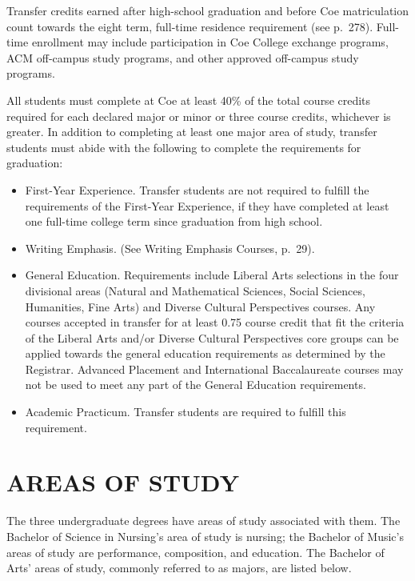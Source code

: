 \documentclass[
  letterpaper,
]{scrbook}
\providecommand{\tightlist}{%
  \setlength{\itemsep}{0pt}\setlength{\parskip}{0pt}}
\begin{document}
Transfer credits earned after high-school graduation and before Coe
matriculation count towards the eight term, full-time residence
requirement (see p.~278). Full-time enrollment may include participation
in Coe College exchange programs, ACM off-campus study programs, and
other approved off-campus study programs.

All students must complete at Coe at least 40\% of the total course
credits required for each declared major or minor or three course
credits, whichever is greater. In addition to completing at least one
major area of study, transfer students must abide with the following to
complete the requirements for graduation:

\begin{itemize}
\tightlist
\item
  First-Year Experience. Transfer students are not required to fulfill
  the requirements of the First-Year Experience, if they have completed
  at least one full-time college term since graduation from high school.
\item
  Writing Emphasis. (See Writing Emphasis Courses, p.~29).
\item
  General Education. Requirements include Liberal Arts selections in the
  four divisional areas (Natural and Mathematical Sciences, Social
  Sciences, Humanities, Fine Arts) and Diverse Cultural Perspectives
  courses. Any courses accepted in transfer for at least 0.75 course
  credit that fit the criteria of the Liberal Arts and/or Diverse
  Cultural Perspectives core groups can be applied towards the general
  education requirements as determined by the Registrar. Advanced
  Placement and International Baccalaureate courses may not be used to
  meet any part of the General Education requirements.
\item
  Academic Practicum. Transfer students are required to fulfill this
  requirement.
\end{itemize}

\chapter{AREAS OF STUDY}\label{sec-areas-of-study}

The three undergraduate degrees have areas of study associated with
them. The Bachelor of Science in Nursing's area of study is nursing; the
Bachelor of Music's areas of study are performance, composition, and
education. The Bachelor of Arts' areas of study, commonly referred to as
majors, are listed below.
\end{document}
